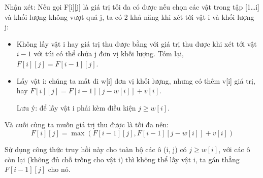 Nhận xét: Nếu gọi F[i][j] là giá trị tối đa có được nếu chọn các vật trong tập [1\dots i] và khối lượng không vượt quá j, ta có 2 khả năng khi xét tới vật i và khối lượng j:
\begin{itemize}
    \item Không lấy vật i hay giá trị thu được bằng với giá trị thu được khi xét tới vật $i-1$ với túi có thể chứa j đơn vị khối lượng. Tóm lại, $F[i][j] = F[i - 1][j]$.
    \item Lấy vật i: chúng ta mất đi w[i] đơn vị khối lượng, nhưng có thêm v[i] giá trị, hay $F[i][j] = F[i - 1][j - w[i]] + v[i]$.
    
    Lưu ý: để lấy vật i phải kèm điều kiện $j\geq w[i]$.
\end{itemize}

Và cuối cùng ta muốn giá trị thu được là tối đa nên:
$$
F[i][j] = \max(F[i - 1][j], F[i - 1][j - w[i]] + v[i])
$$

Sử dụng công thức truy hồi này cho toàn bộ các ô (i, j) có $j\geq w[i]$, với các ô còn lại (không đủ chỗ trống cho vật i) thì không thể lấy vật i, ta gán thẳng $F[i-1][j]$ cho nó.